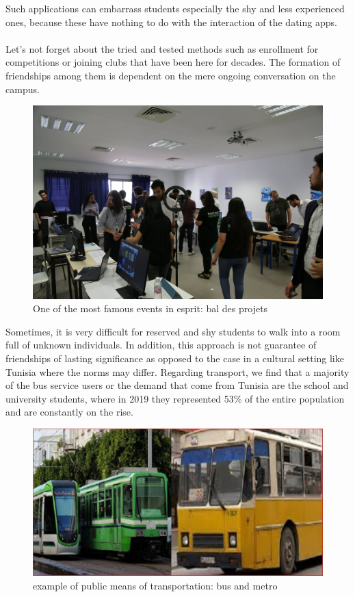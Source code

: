 Such applications can embarrass students especially the shy and less experienced ones, because these have nothing to do with the interaction of the dating apps.
\\
\\
Let's not forget about the tried and tested methods such as enrollment for competitions or joining clubs that have been here for decades. The formation of friendships among them is dependent on the mere ongoing conversation on the campus.
\begin{figure}[H] 
            \centering
            \includegraphics[scale=0.15]{event.jpg}
            \caption{One of the most famous events in esprit: bal des projets} 
            \label{fig: Student events exemple}
\end{figure}
Sometimes, it is very difficult for reserved and shy students to walk into a room full of unknown individuals. In addition, this approach is not guarantee of friendships of lasting significance as opposed to the case in a cultural setting like Tunisia where the norms may differ.
Regarding transport, we find that a majority of the bus service users or the demand that come from Tunisia are the school and university students, where in 2019 they represented 53\% of the entire population and are constantly on the rise. \cite{Share_of_students_in_total_bus_passengers}
\begin{figure}[H] 
            \centering
            \includegraphics[scale=0.3]{bus-metro-tunis.jpeg}
            \caption{example of public means of transportation: bus and metro} 
            \label{fig: example of means of transportation}
\end{figure}
